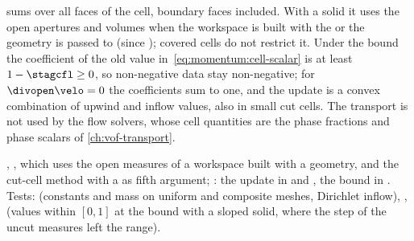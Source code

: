 sums over all faces of the cell, boundary faces included. With a solid it
uses the open apertures and volumes when the workspace is built with the
 or the geometry is passed to
 (since ); covered cells do not restrict
it. Under the bound the coefficient of the old value in~\cref{eq:momentum:cell-scalar}
is at least $1-\stagcfl\ge0$, so non-negative data stay non-negative; for
$\divopen\velo=0$ the coefficients sum to one, and the update is a convex
combination of upwind and inflow values, also in small cut cells. The
transport is not used by the flow solvers, whose cell quantities are the
phase fractions and phase scalars of \cref{ch:vof-transport}.

\begin{implnote}
,
,
which uses the open measures of a workspace built with a geometry, and the
cut-cell method with a  as fifth argument;
: the update
in  and
, the bound in
. Tests:
(constants and mass on uniform and composite meshes, Dirichlet inflow),
,
(values within $[0,1]$ at the bound with a sloped solid, where the step of the
uncut measures left the range).
\end{implnote}

